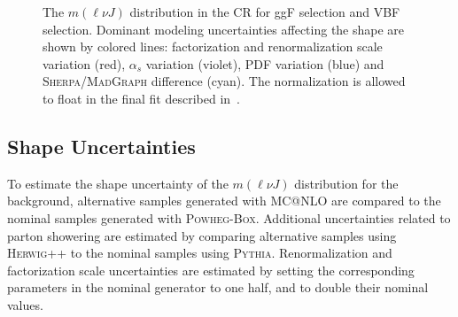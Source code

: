 \begin{figure}[htb]
\centering
{}
\caption[\Wjets modeling variations in the \Wjets high purity control region]{The $m(\ell\nu J)$ distribution in the \Wjets CR for \protect{} ggF selection and \protect{} VBF selection. Dominant \Wjets modeling uncertainties affecting the shape are shown by colored lines: factorization and renormalization scale variation (red), $\alpha_s$ variation (violet), PDF variation (blue) and \textsc{Sherpa}/\textsc{MadGraph} difference (cyan). The normalization is allowed to float in the final fit described in~\Ch{\ref{ch:stats}}.}
\label{fig:wj_syst}
\end{figure}

%
\subsection{\ttbar Shape Uncertainties}
To estimate the shape uncertainty of the $m(\ell\nu J)$ distribution for the \ttbar background, alternative samples generated with \textsc{MC@NLO} are compared to the nominal samples generated with \textsc{Powheg-Box}. Additional uncertainties related to parton showering are estimated by comparing alternative samples using \textsc{Herwig++} to the nominal samples using \textsc{Pythia}. Renormalization and factorization scale uncertainties are estimated by setting the corresponding parameters in the nominal generator to one half, and to double their nominal values. 

